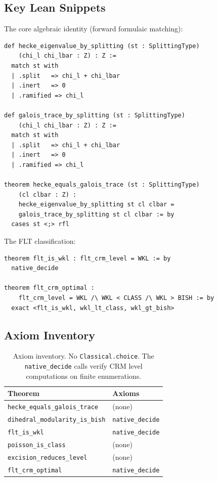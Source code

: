 \documentclass[11pt,a4paper]{article}
\theoremstyle{plain}
\theoremstyle{definition}
\begin{document}
\subsection{Key Lean Snippets}

The core algebraic identity (forward formulaic matching):

\begin{lstlisting}[style=leanstyle, caption={Hecke = Galois trace identity}]
def hecke_eigenvalue_by_splitting (st : SplittingType)
    (chi_l chi_lbar : Z) : Z :=
  match st with
  | .split   => chi_l + chi_lbar
  | .inert   => 0
  | .ramified => chi_l

def galois_trace_by_splitting (st : SplittingType)
    (chi_l chi_lbar : Z) : Z :=
  match st with
  | .split   => chi_l + chi_lbar
  | .inert   => 0
  | .ramified => chi_l

theorem hecke_equals_galois_trace (st : SplittingType)
    (cl clbar : Z) :
    hecke_eigenvalue_by_splitting st cl clbar =
    galois_trace_by_splitting st cl clbar := by
  cases st <;> rfl
\end{lstlisting}

The FLT classification:

\begin{lstlisting}[style=leanstyle, caption={CRM(FLT) = WKL}]
theorem flt_is_wkl : flt_crm_level = WKL := by
  native_decide

theorem flt_crm_optimal :
    flt_crm_level = WKL /\ WKL < CLASS /\ WKL > BISH := by
  exact <flt_is_wkl, wkl_lt_class, wkl_gt_bish>
\end{lstlisting}

\subsection{Axiom Inventory}

\begin{table}[ht]
\centering
\begin{tabular}{@{}ll@{}}
\toprule
\textbf{Theorem} & \textbf{Axioms} \\
\midrule
\texttt{hecke\_equals\_galois\_trace} & (none) \\
\texttt{dihedral\_modularity\_is\_bish} & \texttt{native\_decide} \\
\texttt{flt\_is\_wkl} & \texttt{native\_decide} \\
\texttt{poisson\_is\_class} & (none) \\
\texttt{excision\_reduces\_level} & (none) \\
\texttt{flt\_crm\_optimal} & \texttt{native\_decide} \\
\bottomrule
\end{tabular}
\caption{Axiom inventory. No \texttt{Classical.choice}. The \texttt{native\_decide} calls verify CRM level computations on finite enumerations.}
\label{tab:axiom-inventory}
\end{table}
\end{document}
